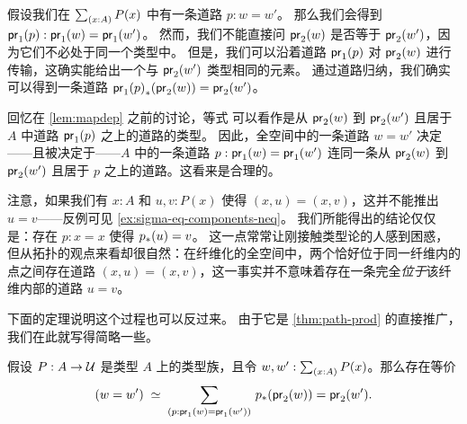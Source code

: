 假设我们在 $\sm{x:A}P(x)$ 中有一条道路 $p:w=w'$。
那么我们会得到 ${\mathsf{pr}_{1}}\mathopen{}\left({p}\right)\mathclose{}:\mathsf{pr}_{1}(w)=\mathsf{pr}_{1}(w')$。
然而，我们不能直接问 $\mathsf{pr}_{2}(w)$ 是否等于 $\mathsf{pr}_{2}(w')$，因为它们不必处于同一个类型中。
但是，我们可以沿着道路 ${\mathsf{pr}_{1}}\mathopen{}\left({p}\right)\mathclose{}$ 对 $\mathsf{pr}_{2}(w)$ 进行传输，这确实能给出一个与 $\mathsf{pr}_{2}(w')$ 类型相同的元素。
通过道路归纳，我们确实可以得到一条道路 ${{\mathsf{pr}_{1}}\mathopen{}\left({p}\right)\mathclose{}}_{*}\mathopen{}\left({\mathsf{pr}_{2}(w)}\right)\mathclose{}=\mathsf{pr}_{2}(w')$。

回忆在 \cref{lem:mapdep} 之前的讨论，等式
可以看作是从 $\mathsf{pr}_{2}(w)$ 到 $\mathsf{pr}_{2}(w')$ 且居于 $A$ 中道路 ${\mathsf{pr}_{1}}\mathopen{}\left({p}\right)\mathclose{}$ 之上的道路的类型。
%
%
因此，全空间中的一条道路 $w=w'$ 决定——且被决定于——$A$ 中的一条道路 $p:\mathsf{pr}_{1}(w)=\mathsf{pr}_{1}(w')$ 连同一条从 $\mathsf{pr}_{2}(w)$ 到 $\mathsf{pr}_{2}(w')$ 且居于 $p$ 之上的道路。这看来是合理的。

\begin{rmk}\label{rmk:sigma-equality-extraction}
  注意，如果我们有 $x:A$ 和 $u,v:P(x)$ 使得 $(x,u)=(x,v)$，这并不能推出 $u=v$——反例可见 \cref{ex:sigma-eq-components-neq}。
  我们所能得出的结论仅仅是：存在 $p:x=x$ 使得 ${p}_{*}\mathopen{}\left({u}\right)\mathclose{} = v$。
  这一点常常让刚接触类型论的人感到困惑，但从拓扑的观点来看却很自然：在纤维化的全空间中，两个恰好位于同一纤维内的点之间存在道路 $(x,u)=(x,v)$，这一事实并不意味着存在一条完全\emph{位于}该纤维内部的道路 $u=v$。
\end{rmk}

下面的定理说明这个过程也可以反过来。
由于它是 \cref{thm:path-prod} 的直接推广，我们在此就写得简略一些。

\begin{thm}\label{thm:path-sigma}
假设 $P:A\to\mathcal{U}$ 是类型 $A$ 上的类型族，且令 $w,w':\sm{x:A}P(x)$。那么存在等价
\begin{equation*}
\eqvspaced{(w=w')}{\dsm{p:\proj{1}(w)=\proj{1}(w')} \trans{p}{\proj{2}(w)}=\proj{2}(w')}.
\end{equation*}
\end{thm}

